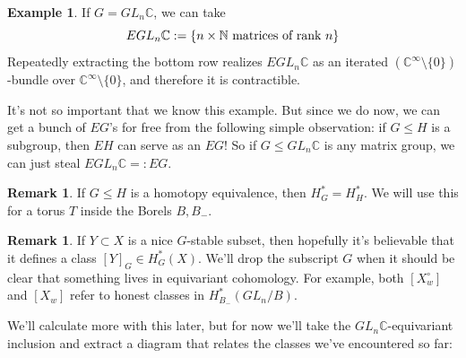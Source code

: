 \documentclass[12pt]{amsart}
\numberwithin{equation}{section}
\theoremstyle{definition}
\newtheorem{Remark}[equation]{Remark}
\newtheorem{Example}[equation]{Example}
\numberwithin{figure}{section}
\begin{document}
\begin{Example}
If $G=GL_n\mathbb{C}$, we can take
\[ EGL_n\mathbb{C} := \{ n \times \mathbb{N} \textup{ matrices of rank $n$}\}\]
Repeatedly extracting the bottom row realizes $EGL_n\mathbb{C}$ as an iterated $(\mathbb{C}^\infty \setminus \{0\})$-bundle over $\mathbb{C}^\infty \setminus \{0\}$, and therefore it is contractible.

It's not so important that we know this example.  But since we do now, we can get a bunch of $EG$'s for free from the following simple observation: if $G\leq H$ is a subgroup, then $EH$ can serve as an $EG$!  So if $G \leq GL_n\mathbb{C}$ is any matrix group, we can just steal $EGL_n\mathbb{C}=:EG$.
\end{Example}

\begin{Remark}
If $G\leq H$ is a homotopy equivalence, then $H^*_G = H^*_H$. We will use this for a torus $T$ inside the Borels $B,B_-$.
\end{Remark}

\begin{Remark}
If $Y \subset X$ is a nice $G$-stable subset, then hopefully it's believable that it defines a class $[Y]_G \in H^*_G(X)$. We'll drop the subscript $G$ when it should be clear that something lives in equivariant cohomology. For example, both $[X_w^\circ]$ and $[X_w]$ refer to honest classes in $H_{B_-}^*(GL_n/B)$.
\end{Remark}

We'll calculate more with this later, but for now we'll take the $GL_n\mathbb{C}$-equivariant inclusion  and extract a diagram that relates the classes we've encountered so far:

\begin{center}
\end{center}
\end{document}
